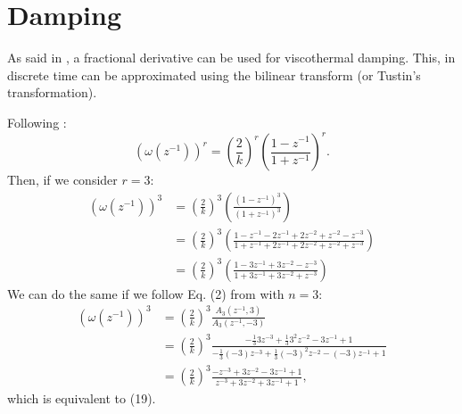 \documentclass[dvipsnames]{article}
\def\z{z^{-1}}
\begin{document}
\section{Damping}
As said in \cite{Bilbao2013}, a fractional derivative can be used for viscothermal damping. This, in discrete time can be approximated using the bilinear transform (or Tustin's transformation).

Following \cite{Chen2002}:
\begin{equation}
    (\omega(\z))^r = \left(\frac{2}{k}\right)^r \left(\frac{1-\z}{1+\z}\right)^r.
\end{equation}
Then, if we consider $r = 3$:
\begin{equation}
    \begin{aligned}
    (\omega(\z))^3 &= \left(\frac{2}{k}\right)^3\left(\frac{(1-\z)^3}{(1+\z)^3}\right)\\
    &= \left(\frac{2}{k}\right)^3\left(\frac{1-\z-2\z+2z^{-2}+z^{-2}-z^{-3}}{1+\z+2\z+2z^{-2}+z^{-2}+z^{-3}}\right)\\
    &= \left(\frac{2}{k}\right)^3\left(\frac{1-3\z+3z^{-2}-z^{-3}}{1+3\z+3z^{-2}+z^{-3}}\right)
    \end{aligned}
\end{equation}
We can do the same if we follow Eq. (2) from \cite{Chen2002} with $n=3$:
\begin{equation}
    \begin{aligned}
    (\omega(\z))^3 &= \left(\frac{2}{k}\right)^3\frac{A_3(\z,3)}{A_3(\z,-3)}\\
    &= \left(\frac{2}{k}\right)^3\frac{-\frac{1}{3}3z^{-3}+\frac{1}{3}3^2z^{-2}-3\z+1}{-\frac{1}{3}(-3)z^{-3}+\frac{1}{3}(-3)^2z^{-2}-(-3)\z+1}\\
    &=\left(\frac{2}{k}\right)^3\frac{-z^{-3}+3z^{-2}-3\z+1}{z^{-3}+3z^{-2}+3\z+1},
    \end{aligned}
\end{equation}
which is equivalent to (19).
\end{document}
